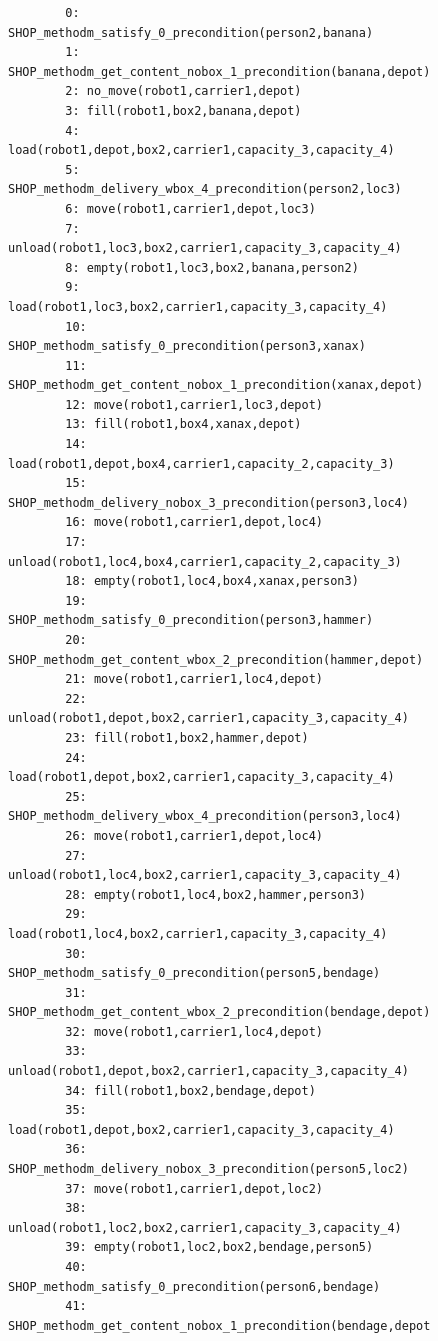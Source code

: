 \begin{figure}
    \footnotesize
    \begin{verbatim}
        0: SHOP_methodm_satisfy_0_precondition(person2,banana)
        1: SHOP_methodm_get_content_nobox_1_precondition(banana,depot)
        2: no_move(robot1,carrier1,depot)
        3: fill(robot1,box2,banana,depot)
        4: load(robot1,depot,box2,carrier1,capacity_3,capacity_4)
        5: SHOP_methodm_delivery_wbox_4_precondition(person2,loc3)
        6: move(robot1,carrier1,depot,loc3)
        7: unload(robot1,loc3,box2,carrier1,capacity_3,capacity_4)
        8: empty(robot1,loc3,box2,banana,person2)
        9: load(robot1,loc3,box2,carrier1,capacity_3,capacity_4)
        10: SHOP_methodm_satisfy_0_precondition(person3,xanax)
        11: SHOP_methodm_get_content_nobox_1_precondition(xanax,depot)
        12: move(robot1,carrier1,loc3,depot)
        13: fill(robot1,box4,xanax,depot)
        14: load(robot1,depot,box4,carrier1,capacity_2,capacity_3)
        15: SHOP_methodm_delivery_nobox_3_precondition(person3,loc4)
        16: move(robot1,carrier1,depot,loc4)
        17: unload(robot1,loc4,box4,carrier1,capacity_2,capacity_3)
        18: empty(robot1,loc4,box4,xanax,person3)
        19: SHOP_methodm_satisfy_0_precondition(person3,hammer)
        20: SHOP_methodm_get_content_wbox_2_precondition(hammer,depot)
        21: move(robot1,carrier1,loc4,depot)
        22: unload(robot1,depot,box2,carrier1,capacity_3,capacity_4)
        23: fill(robot1,box2,hammer,depot)
        24: load(robot1,depot,box2,carrier1,capacity_3,capacity_4)
        25: SHOP_methodm_delivery_wbox_4_precondition(person3,loc4)
        26: move(robot1,carrier1,depot,loc4)
        27: unload(robot1,loc4,box2,carrier1,capacity_3,capacity_4)
        28: empty(robot1,loc4,box2,hammer,person3)
        29: load(robot1,loc4,box2,carrier1,capacity_3,capacity_4)
        30: SHOP_methodm_satisfy_0_precondition(person5,bendage)
        31: SHOP_methodm_get_content_wbox_2_precondition(bendage,depot)
        32: move(robot1,carrier1,loc4,depot)
        33: unload(robot1,depot,box2,carrier1,capacity_3,capacity_4)
        34: fill(robot1,box2,bendage,depot)
        35: load(robot1,depot,box2,carrier1,capacity_3,capacity_4)
        36: SHOP_methodm_delivery_nobox_3_precondition(person5,loc2)
        37: move(robot1,carrier1,depot,loc2)
        38: unload(robot1,loc2,box2,carrier1,capacity_3,capacity_4)
        39: empty(robot1,loc2,box2,bendage,person5)
        40: SHOP_methodm_satisfy_0_precondition(person6,bendage)
        41: SHOP_methodm_get_content_nobox_1_precondition(bendage,depot)

\end{verbatim}
\end{figure}
